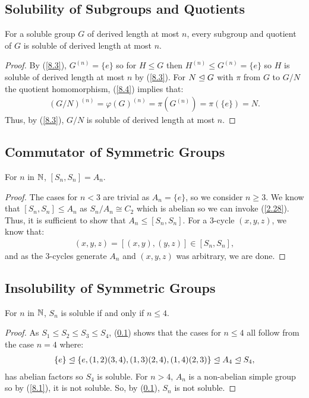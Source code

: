 \subsection{Solubility of Subgroups and Quotients} \label{8.5}

For a soluble group $G$ of derived length at most $n$, every
subgroup and quotient of $G$ is soluble of derived length at
most $n$.

\begin{proof}
    By (\ref{8.3}), $G^{(n)} = \{e\}$ so for $H \leq G$ then
    $H^{(n)} \leq G^{(n)} = \{e\}$ so $H$ is soluble of derived
    length at most $n$ by (\ref{8.3}). For $N \trianglelefteq G$
    with $\pi$ from $G$ to $G / N$ the quotient homomorphism,
    (\ref{8.4}) implies that: \begin{align*}
        (G / N)^{(n)} = \varphi(G)^{(n)} = \pi(G^{(n)}) 
        = \pi(\{e\}) = N. \tag{8.4}
    \end{align*} Thus, by (\ref{8.3}), $G / N$ is soluble 
    of derived length at most $n$.
\end{proof}

\subsection{Commutator of Symmetric Groups} \label{8.7}

For $n$ in $\mathbb{N}$, $[S_n, S_n] = A_n$.

\begin{proof}
    The cases for $n < 3$ are trivial as $A_n = \{e\}$, 
    so we consider $n \geq 3$.
    We know that $[S_n, S_n] \leq A_n$ as $S_n / A_n \cong C_2$
    which is abelian so we can invoke (\ref{2.28}). Thus, it is
    sufficient to show that $A_n \leq [S_n, S_n]$. For
    a 3-cycle $(x, y, z)$, we know that: \begin{align*}
        (x, y, z) = [(x, y), (y, z)] \in [S_n, S_n],
    \end{align*} and as the 3-cycles generate $A_n$ and
    $(x, y, z)$ was arbitrary, we are done.
\end{proof}

\subsection{Insolubility of Symmetric Groups} \label{8.6}

For $n$ in $\mathbb{N}$, $S_n$ is soluble if and only if $n \leq 4$.

\begin{proof}
    As $S_1 \leq S_2 \leq S_3 \leq S_4$, (\ref{8.5}) shows that the
    cases for $n \leq 4$ all follow from the case $n = 4$ where:
    \begin{align*}
        \{e\} \trianglelefteq \{e, (1, 2)(3, 4), (1, 3)(2, 4), (1, 4)(2, 3)\}
        \trianglelefteq A_4 \trianglelefteq S_4,
    \end{align*} has abelian factors so $S_4$ is soluble.
    For $n > 4$, $A_n$ is a non-abelian simple group
    so by (\ref{8.1}), it is not soluble. So, by (\ref{8.5}),
    $S_n$ is not soluble.
\end{proof}

